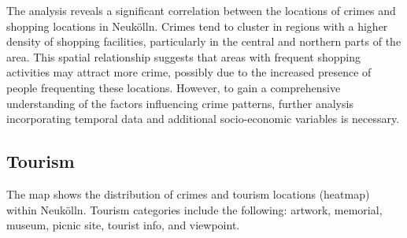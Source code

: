 The analysis reveals a significant correlation between the locations of crimes and shopping locations in Neukölln. Crimes tend to cluster in regions with a higher density of shopping facilities, particularly in the central and northern parts of the area. This spatial relationship suggests that areas with frequent shopping activities may attract more crime, possibly due to the increased presence of people frequenting these locations. However, to gain a comprehensive understanding of the factors influencing crime patterns, further analysis incorporating temporal data and additional socio-economic variables is necessary. 

\subsection{Tourism}
The map shows the distribution of crimes and tourism locations (heatmap) within Neukölln. Tourism categories include the following: artwork, memorial, museum, picnic site, tourist info, and viewpoint. 
